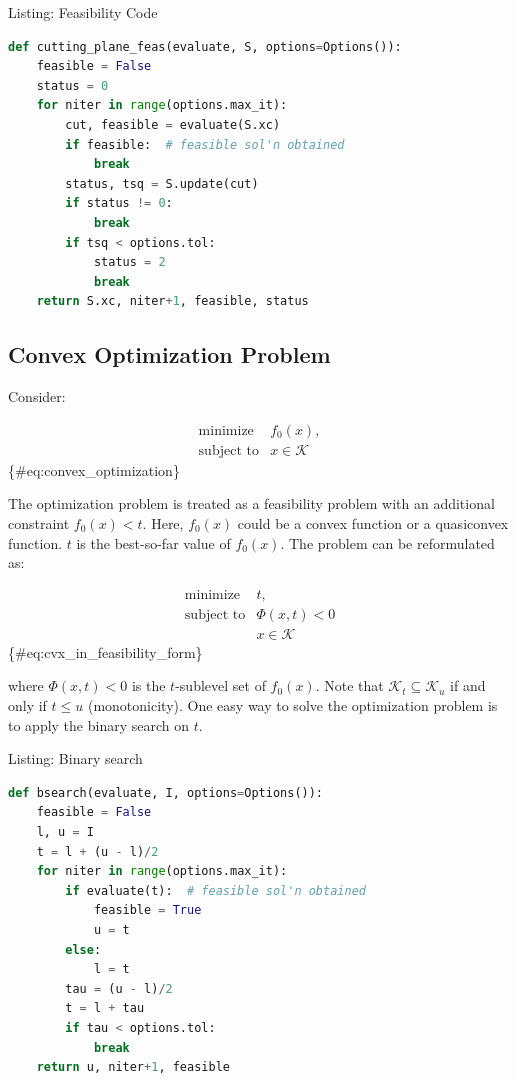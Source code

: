 \documentclass[]{article}
\begin{document}
Listing: Feasibility Code

\begin{lstlisting}[language=Python, label=lst:feasibility_code]
def cutting_plane_feas(evaluate, S, options=Options()):
    feasible = False
    status = 0
    for niter in range(options.max_it):
        cut, feasible = evaluate(S.xc)
        if feasible:  # feasible sol'n obtained
            break
        status, tsq = S.update(cut)
        if status != 0:
            break
        if tsq < options.tol:
            status = 2
            break
    return S.xc, niter+1, feasible, status
\end{lstlisting}

\hypertarget{convex-optimization-problem}{%
\subsection{Convex Optimization
Problem}\label{convex-optimization-problem}}

Consider:

\[\begin{array}{ll}
    \text{minimize}     & f_0(x), \\
    \text{subject to}   & x \in \mathcal{K}
\end{array}\] \{\#eq:convex\_optimization\}

The optimization problem is treated as a feasibility problem with an
additional constraint \(f_0(x) < t\). Here, \(f_0(x)\) could be a convex
function or a quasiconvex function. \(t\) is the best-so-far value of
\(f_0(x)\). The problem can be reformulated as:

\[\begin{array}{ll}
    \text{minimize}     & t, \\
    \text{subject to}   & \Phi(x, t) < 0 \\
                        & x \in \mathcal{K}
\end{array}\] \{\#eq:cvx\_in\_feasibility\_form\}

where \(\Phi(x, t) < 0\) is the \(t\)-sublevel set of \(f_0(x)\). Note
that \(\mathcal{K}_t \subseteq \mathcal{K}_u\) if and only if
\(t \leq u\) (monotonicity). One easy way to solve the optimization
problem is to apply the binary search on \(t\).

Listing: Binary search

\begin{lstlisting}[language=Python, label=lst:binary_search]
def bsearch(evaluate, I, options=Options()):
    feasible = False
    l, u = I
    t = l + (u - l)/2
    for niter in range(options.max_it):
        if evaluate(t):  # feasible sol'n obtained
            feasible = True
            u = t
        else:
            l = t
        tau = (u - l)/2
        t = l + tau
        if tau < options.tol:
            break
    return u, niter+1, feasible
\end{lstlisting}
\end{document}
